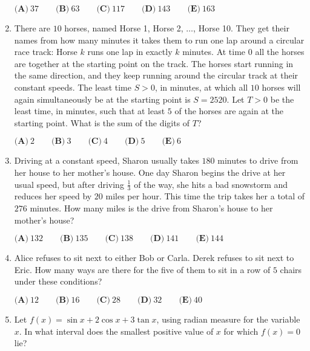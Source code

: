\documentclass{article}
\begin{document}
\begin{enumerate}[label=\arabic*., itemsep=0.5em]
$\textbf{(A)}\ 37\qquad\textbf{(B)}\ 63\qquad\textbf{(C)}\ 117\qquad\textbf{(D)}\ 143\qquad\textbf{(E)}\ 163$\par \vspace{0.5em}\item There are $10$ horses, named Horse 1, Horse 2, $\ldots$, Horse 10. They get their names from how many minutes it takes them to run one lap around a circular race track: Horse $k$ runs one lap in exactly $k$ minutes. At time 0 all the horses are together at the starting point on the track. The horses start running in the same direction, and they keep running around the circular track at their constant speeds. The least time $S > 0$, in minutes, at which all $10$ horses will again simultaneously be at the starting point is $S = 2520$. Let  $T>0$ be the least time, in minutes, such that at least $5$ of the horses are again at the starting point. What is the sum of the digits of  $T$?

$\textbf{(A)}\ 2\qquad\textbf{(B)}\ 3\qquad\textbf{(C)}\ 4\qquad\textbf{(D)}\ 5\qquad\textbf{(E)}\ 6$\par \vspace{0.5em}\item Driving at a constant speed, Sharon usually takes $180$ minutes to drive from her house to her mother's house. One day Sharon begins the drive at her usual speed, but after driving $\frac{1}{3}$ of the way, she hits a bad snowstorm and reduces her speed by $20$ miles per hour. This time the trip takes her a total of $276$ minutes. How many miles is the drive from Sharon's house to her mother's house?

$\textbf{(A)}\ 132 \qquad\textbf{(B)}\ 135 \qquad\textbf{(C)}\ 138 \qquad\textbf{(D)}\ 141 \qquad\textbf{(E)}\ 144$\par \vspace{0.5em}\item Alice refuses to sit next to either Bob or Carla. Derek refuses to sit next to Eric. How many ways are there for the five of them to sit in a row of $5$ chairs under these conditions?

$\textbf{(A)}\ 12  \qquad \textbf{(B)}\ 16 \qquad\textbf{(C)}\ 28 \qquad\textbf{(D)}\ 32 \qquad\textbf{(E)}\ 40$\par \vspace{0.5em}\item Let $f(x) = \sin{x} + 2\cos{x} + 3\tan{x}$, using radian measure for the variable $x$. In what interval does the smallest positive value of $x$ for which $f(x) = 0$ lie?


\end{enumerate}
\end{document}
